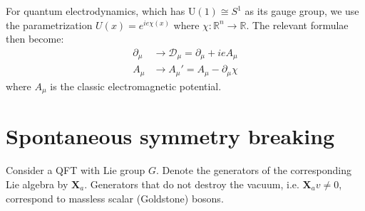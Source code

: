 	\begin{example}[QED]
		For quantum electrodynamics, which has U$(1)\cong S^1$ as its gauge group, we use the parametrization $U(x) = e^{ie\chi(x)}$ where $\chi:\mathbb{R}^n\rightarrow\mathbb{R}$. The relevant formulae then become:
		\begin{align}
			\partial_\mu &\longrightarrow \mathcal{D}_\mu = \partial_\mu + ieA_\mu\\
			A_\mu &\longrightarrow A_\mu' = A_\mu - \partial_\mu\chi
		\end{align}
		where $A_\mu$ is the classic electromagnetic potential.
	\end{example}
	
\section{Spontaneous symmetry breaking}

	\begin{theorem}[Goldstone]
		Consider a QFT with Lie group $G$. Denote the generators of the corresponding Lie algebra by $\mathbf{X}_a$. Generators that do not destroy the vacuum\footnotemark, i.e. $\mathbf{X}_av\neq0$, correspond to massless scalar (Goldstone) bosons.
	\end{theorem}

